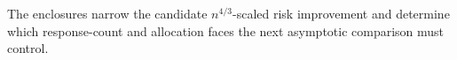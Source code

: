 The enclosures narrow the candidate \(n^{4/3}\)-scaled risk improvement and determine which response-count and allocation faces the next asymptotic comparison must control.